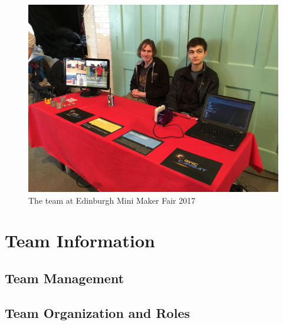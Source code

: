 \documentclass[]{report}
\begin{document}
	\begin{figure}[h]
		\hfill\includegraphics[scale=0.1]{mfaire.jpg}\hspace*{\fill}
		\caption{The team at Edinburgh Mini Maker Fair 2017}
		\label{mfair}
	\end{figure}
	
		
	\chapter{Team Information}
	
	\section{Team Management}
	
	\section{Team Organization and Roles}
	
\end{document}
